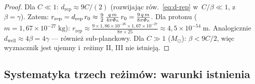 \begin{proof}
Dla $C \ll 1$: $d_{\mathrm{rep}} \approx 9C/(2)$
(rozwijaj\k{a}c r\'ow.~\ref{eq:d-rep} w~$C/\beta \ll 1$,
z~$\beta = \gamma$). Zatem:
$r_{\mathrm{rep}} = d_{\mathrm{rep}}\,r_0
\approx \frac{9}{2}\,\frac{q\,m}{4\pi\varPhi_0}\,r_0
= \frac{9\,q\,m}{8\pi\varPhi_0}$.
Dla protonu ($m = 1{,}67\times10^{-27}\;\mathrm{kg}$):
$r_{\mathrm{rep}} \approx \frac{9 \times 1{,}86\times10^{-26}
\times 1{,}67\times10^{-27}}{8\pi \times 25}
\approx 4{,}5\times10^{-54}\;\mathrm{m}$.
Analogicznie $d_{\mathrm{well}} \approx 4\beta = 4\gamma$ ---
r\'ownie\.z sub-planckowy.
Dla $C \gg 1$ ($M_\odot$): $\beta < 9C/2$, wi\k{e}c
wyznacznik jest ujemny i~re\.zimy II, III nie istniej\k{a}.
\end{proof}

\subsection{Systematyka trzech re\.zim\'ow: warunki
  istnienia}\label{ssec:systematyka-rezimow}

